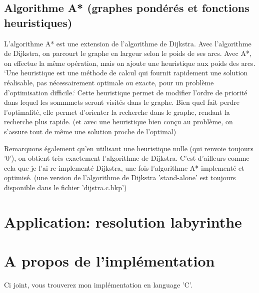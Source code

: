 \documentclass[a4paper,10pt]{article}
\begin{document}
  \subsection{Algorithme A* (graphes pondérés et fonctions heuristiques)}
    L'algorithme A* est une extension de l'algorithme de Dijkstra.\newline
    Avec l'algorithme de Dijkstra, on parcourt le graphe en largeur selon le poids de ses arcs.
    Avec A*, on effectue la même opération, mais on ajoute une heuristique aux poids des arcs.\newline
    `Une heuristique est une méthode de calcul qui fournit rapidement une solution réalisable,
    pas nécessairement optimale ou exacte, pour un problème d'optimisation difficile.`\newline
    Cette heuristique permet de modifier l'ordre de priorité dans lequel les sommmets seront visités dans le graphe.
    Bien quel fait perdre l'optimalité, elle permet d'orienter la recherche dans le graphe, rendant la recherche plus rapide.
    (et avec une heuristique bien conçu au problème, on s'assure tout de même une solution proche de l'optimal)\newline\newline
    
    Remarquons également qu'en utilisant une heuristique nulle (qui renvoie toujours '0'), on obtient très exactement l'algorithme de Dijkstra.
    C'est d'ailleurs comme cela que je l'ai re-implementé Dijkstra, une fois l'algorithme A* implementé et optimisé.\newline
    (une version de l'algorithme de Dijkstra 'stand-alone' est toujours disponible dans le fichier 'dijstra.c.bkp')\newline\newline
    
    
    
    
    
  \newpage
  \section{Application: resolution labyrinthe}
  
  \newpage
  \section{A propos de l'implémentation}
    Ci joint, vous trouverez mon implémentation en language 'C'.
\end{document}
